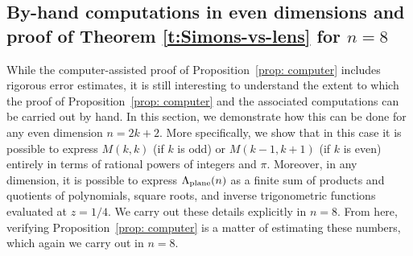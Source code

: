 \documentclass[10pt,reqno]{amsart}
\numberwithin{equation}{section}
\theoremstyle{definition}
\DeclareMathOperator{\Lawson}{Lawson}
\begin{document}
{{%


 
\medskip
%
%




\subsection{By-hand computations in even dimensions and proof of Theorem \ref{t:Simons-vs-lens} for $n=8$}\label{ssec: by-hand}
While the computer-assisted proof of Proposition~\ref{prop: computer} includes rigorous error estimates, it is still interesting to understand the extent to which the proof of Proposition~\ref{prop: computer} and the associated computations can be carried out by hand. In this section, we demonstrate how this can be done for any even dimension $n=2k+2$. More specifically, we show that in this case it is possible to express $M(k,k)$ (if $k$ is odd) or $M(k-1,k+1)$ (if $k$ is even) entirely in terms of rational powers of integers and $\pi$. Moreover, in any dimension, it is possible to express $\Lambda_{\rm plane}(n)$ as a finite sum of products and quotients of polynomials, square roots, and inverse trigonometric functions evaluated at $z=1/4$. We carry out these details explicitly in $n=8$. From here, verifying Proposition~\ref{prop: computer} is a matter of estimating these numbers, {which again we carry out in $n=8$.} 


}}
\end{document}
